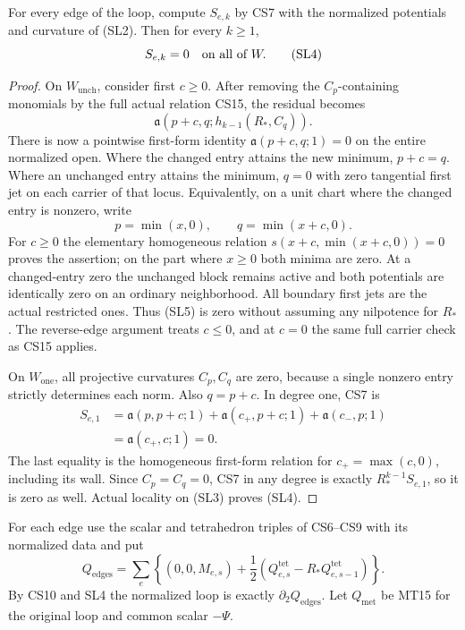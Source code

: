 \begin{lemma}
For every edge of the loop, compute $S_{e,k}$ by CS7 with the
normalized potentials and curvature of (SL2).  Then for every
$k\ge1$,
\[
                         S_{e,k}=0
                               \quad\hbox{on all of }W.
 \tag{SL4}
\]
\end{lemma}

\begin{proof}
On $W_{\mathrm{unch}}$, consider first $c\ge0$.  After removing
the $C_p$-containing monomials by the full actual relation CS15,
the residual becomes
\[
               \mathfrak a(p+c,q;h_{k-1}(R_*,C_q)).
 \tag{SL5}
\]
There is now a pointwise first-form identity
$\mathfrak a(p+c,q;1)=0$ on the entire normalized open.
Where the changed entry attains the new minimum, $p+c=q$.
Where an unchanged entry attains the minimum, $q=0$ with
zero tangential first jet on each carrier of that locus.
Equivalently, on a unit chart where the changed entry is nonzero,
write
\[
                  p=\min(x,0),\qquad q=\min(x+c,0).
 \tag{SL6}
\]
For $c\ge0$ the elementary homogeneous relation
$s(x+c,\min(x+c,0))=0$ proves the assertion; on the part
where $x\ge0$ both minima are zero.  At a changed-entry zero
the unchanged block remains active and both potentials are
identically zero on an ordinary neighborhood.  All boundary
first jets are the actual restricted ones.  Thus (SL5) is zero
without assuming any nilpotence for $R_*$.
The reverse-edge argument treats $c\le0$, and at $c=0$
the same full carrier check as CS15 applies.

On $W_{\mathrm{one}}$, all projective curvatures $C_p,C_q$
are zero, because a single nonzero entry strictly determines
each norm.  Also $q=p+c$.  In degree one, CS7 is
\[
 \begin{split}
 S_{e,1}
  &=\mathfrak a(p,p+c;1)
       +\mathfrak a(c_+,p+c;1)
       +\mathfrak a(c_-,p;1)\\
  &=\mathfrak a(c_+,c;1)=0.
 \end{split}
 \tag{SL7}
\]
The last equality is the homogeneous first-form relation for
$c_+=\max(c,0)$, including its wall.  Since $C_p=C_q=0$,
CS7 in any degree is exactly $R_*^{k-1}S_{e,1}$, so it is
zero as well.  Actual locality on (SL3) proves (SL4).
\end{proof}

For each edge use the scalar and tetrahedron triples of CS6--CS9
with its normalized data and put
\[
 Q_{\mathrm{edges}}=
 \sum_{e}\left\{(0,0,M_{e,s})
       +\frac12(Q^{\mathrm{tet}}_{e,s}
                         -R_*Q^{\mathrm{tet}}_{e,s-1})\right\}.
 \tag{SL8}
\]
By CS10 and SL4 the normalized loop is exactly
$\partial_2Q_{\mathrm{edges}}$.  Let $Q_{\mathrm{met}}$ be
MT15 for the original loop and common scalar $-\Psi$.

